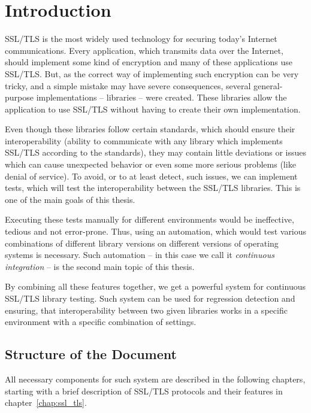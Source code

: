 
\chapter{Introduction}
    SSL/TLS is the most widely used technology for securing today's Internet communications.
    Every application, which transmits data over the Internet, should implement
    some kind of encryption and many of these applications use SSL/TLS. But, as
    the correct way of implementing such encryption can be very tricky, and
    a simple mistake may have severe consequences, several general-purpose
    implementations -- libraries -- were created. These libraries allow the
    application to use SSL/TLS without having to create their own implementation.

    Even though these libraries follow certain standards, which should ensure
    their interoperability (ability to communicate with any library which
    implements SSL/TLS according to the standards), they may contain little
    deviations or issues which can cause unexpected behavior or even some more
    serious problems (like denial of service). To avoid,
    or to at least detect, such issues, we can implement tests, which will test the
    interoperability between the SSL/TLS libraries. This is one of the main
    goals of this thesis.

    Executing these tests manually for different environments would be ineffective,
    tedious and not error-prone.
    Thus, using an automation, which would test various combinations of different
    library versions on different versions of operating systems is necessary.
    Such automation -- in this case we call it \textit{continuous integration} -- is
    the second main topic of this thesis.

    By combining all these features together, we get a powerful system for continuous
    SSL/TLS library testing. Such system can be used for regression detection
    and ensuring, that interoperability between two given libraries works in a specific
    environment with a specific combination of settings.

\section{Structure of the Document}
    All necessary components
    for such system are described in the following chapters, starting with a
    brief description of SSL/TLS protocols and their features in
    chapter~\ref{chap:ssl_tls}.

